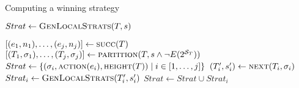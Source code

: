 

\begin{algorithm}
   \caption{Computing a winning strategy}\label{alg:strat}
   \begin{algorithmic}[1]
            \State $Strat \gets \Call{GenLocalStrats}{T,s}$
            \State {}
        \EndFunction
        \Statex

            \State $[(e_1, n_1),\ldots,(e_j, n_j)] \gets \Call{succ}{T}$
            \State $[(T_1,\sigma_1),\ldots,(T_j, \sigma_j)] \gets \Call{partition}{T, s \land \neg E(2^{\mathcal{S}_T})}$
            \State $Strat \gets \{(\sigma_i, \Call{action}{e_i}, \Call{height}{T}) \mid i \in[1,\ldots,j]\}$\label{alg:strat:strati}
            \label{alg:strat:for}
            \State $(T_i', s_i') \gets \Call{next}{T_i, \sigma_i}$\label{alg:strat:next}
                \State $Strat_i \gets \Call{GenLocalStrats}{T_i', s_i'}$\label{alg:strat:rec}
                \State $Strat \gets Strat \cup Strat_i$
            \EndFor\label{alg:strat:endfor}
            \State {} \label{alg:strat:return}
        \EndFunction
    \end{algorithmic}
\end{algorithm}


